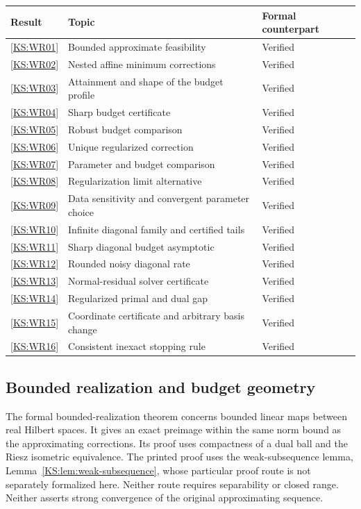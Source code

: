 \documentclass[11pt,oneside,openany]{book}
\numberwithin{equation}{section}
\begin{document}
\begin{longtable}{@{}p{.11\linewidth}p{.60\linewidth}p{.22\linewidth}@{}}
\toprule Result & Topic & Formal counterpart\\\midrule\endhead
\ref{KS:WR01} & Bounded approximate feasibility & Verified\\[4pt]
\ref{KS:WR02} & Nested affine minimum corrections & Verified\\[4pt]
\ref{KS:WR03} & Attainment and shape of the budget profile & Verified\\[4pt]
\ref{KS:WR04} & Sharp budget certificate & Verified\\[4pt]
\ref{KS:WR05} & Robust budget comparison & Verified\\[4pt]
\ref{KS:WR06} & Unique regularized correction & Verified\\[4pt]
\ref{KS:WR07} & Parameter and budget comparison & Verified\\[4pt]
\ref{KS:WR08} & Regularization limit alternative & Verified\\[4pt]
\ref{KS:WR09} & Data sensitivity and convergent parameter choice & Verified\\[4pt]
\ref{KS:WR10} & Infinite diagonal family and certified tails & Verified\\[4pt]
\ref{KS:WR11} & Sharp diagonal budget asymptotic & Verified\\[4pt]
\ref{KS:WR12} & Rounded noisy diagonal rate & Verified\\[4pt]
\ref{KS:WR13} & Normal-residual solver certificate & Verified\\[4pt]
\ref{KS:WR14} & Regularized primal and dual gap & Verified\\[4pt]
\ref{KS:WR15} & Coordinate certificate and arbitrary basis change & Verified\\[4pt]
\ref{KS:WR16} & Consistent inexact stopping rule & Verified\\
\bottomrule\end{longtable}

\subsection{Bounded realization and budget geometry}\label{KS:app:wr-source-map}
The formal bounded-realization theorem concerns bounded linear maps between real Hilbert spaces. It gives an exact preimage within the same norm bound as the approximating corrections. Its proof uses compactness of a dual ball and the Riesz isometric equivalence. The printed proof uses the weak-subsequence lemma, Lemma~\ref{KS:lem:weak-subsequence}, whose particular proof route is not separately formalized here. Neither route requires separability or closed range. Neither asserts strong convergence of the original approximating sequence.
\end{document}
